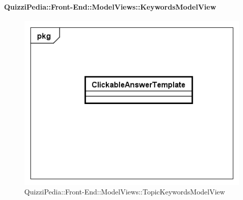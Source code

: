 				\paragraph{QuizziPedia::Front-End::ModelViews::KeywordsModelView}
				
				\label{QuizziPedia::Front-End::ModelViews::TopicKeywordsModelView}
				
				\begin{figure}[ht]
					\centering
					\includegraphics[scale=0.5,keepaspectratio]{UML/Classi/Front-End/QuizziPedia_Front-end_Templates_ClickableAnswerTemplate.png}
					\caption{QuizziPedia::Front-End::ModelViews::TopicKeywordsModelView}
				\end{figure} \FloatBarrier
				

